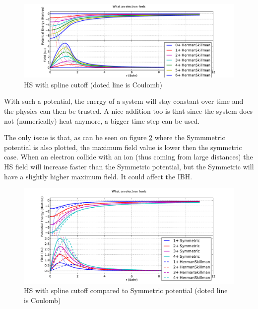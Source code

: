 \documentclass[12pt,letterpaper]{article}
\begin{document}
\begin{figure}
\includegraphics[width=0.98\columnwidth]{hs_4_spline}
\caption{\label{fig:hs:spline_cutoff}HS with spline cutoff (doted line is Coulomb)}
\end{figure}

With such a potential, the energy of a system will stay constant over time and the physics can then be trusted. A nice addition too is that since the system does not (numerically) heat anymore, a bigger time step can be used.

The only issue is that, as can be seen on figure \ref{fig:hs:spline_cutoff_and_symmetric} where the Symmmetric potential is also plotted, the maximum field value is lower then the symmetric case. When an electron collide with an ion (thus coming from large distances) the HS field will increase faster than the Symmetric potential, but the Symmetric will have a slightly higher maximum field. It could affect the IBH.


\begin{figure}
\includegraphics[width=0.98\columnwidth]{hs_4_spline_and_symmetric}
\caption{\label{fig:hs:spline_cutoff_and_symmetric}HS with spline cutoff compared to Symmetric potential (doted line is Coulomb)}
\end{figure}
\end{document}
